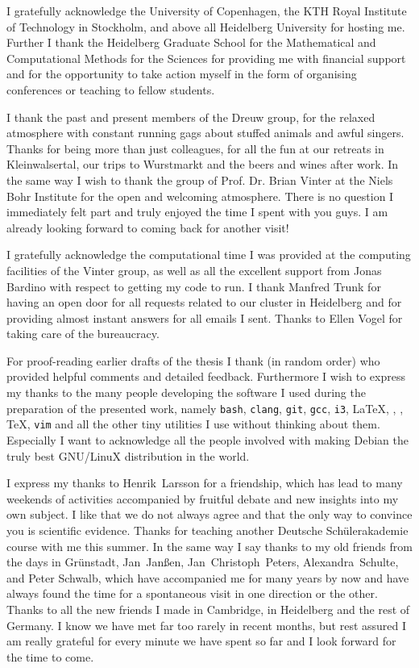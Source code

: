 
I gratefully acknowledge
the University of Copenhagen, the
KTH Royal Institute of Technology in Stockholm,
and above all Heidelberg University for hosting me.
Further I thank the Heidelberg Graduate School
for the Mathematical and Computational Methods for the Sciences
for providing me with financial support
and for the opportunity to take action myself
in the form of organising conferences or teaching to fellow students.

I thank the past and present members of the Dreuw group,
for the relaxed atmosphere
with constant running gags about
stuffed animals and awful singers.
Thanks for being more than just colleagues,
for all the fun
at our retreats in Kleinwalsertal, our trips to Wurstmarkt and
the beers and wines after work.
In the same way I wish to thank
the group of Prof. Dr. Brian Vinter at the Niels Bohr Institute
for the open and welcoming atmosphere.
There is no question I immediately felt part
and truly enjoyed the time I spent with you guys.
I am already looking forward to coming back for another visit!

I gratefully acknowledge the computational time I was provided
at the computing facilities of the Vinter group,
as well as all the excellent support from Jonas Bardino
with respect to getting my code to run.
I thank Manfred Trunk
for having an open door for all requests related
to our cluster in Heidelberg
and for providing almost instant answers for all emails I sent.
Thanks to Ellen Vogel for taking care of the bureaucracy.


For proof-reading earlier drafts of the thesis I thank
(in random order)
%
who provided helpful comments and detailed feedback.
Furthermore I wish to express my thanks to the many people developing
the software I used during the preparation of the presented work,
namely
\texttt{bash},
\texttt{clang},
\texttt{git},
\texttt{gcc},
\texttt{i3},
\LaTeX,
\numpy,
\python,
\TeX,
\texttt{vim}
and all the other tiny utilities I use without thinking about them.
Especially I want to acknowledge all the people
involved with making Debian the truly best
GNU/LinuX distribution in the world.


I express my thanks to Henrik~Larsson for a friendship,
which has lead to many weekends of activities accompanied
by fruitful debate and new insights into my own subject.
I like that we do not always agree
and that the only way to convince you is scientific evidence.
Thanks for teaching another Deutsche Schülerakademie course with me this summer.
In the same way I say thanks to my old friends
from the days in Grünstadt,
Jan~Janßen,
Jan~Christoph~Peters,
Alexandra~Schulte,
and
Peter Schwalb,
which have accompanied me for many years by now
and have always found the time for a spontaneous visit
in one direction or the other.
Thanks to all the new friends I made in Cambridge,
in Heidelberg and the rest of Germany.
I know we have met far too rarely in recent months,
but rest assured I am really
grateful for every minute we have spent so far
and I look forward for the time to come.

